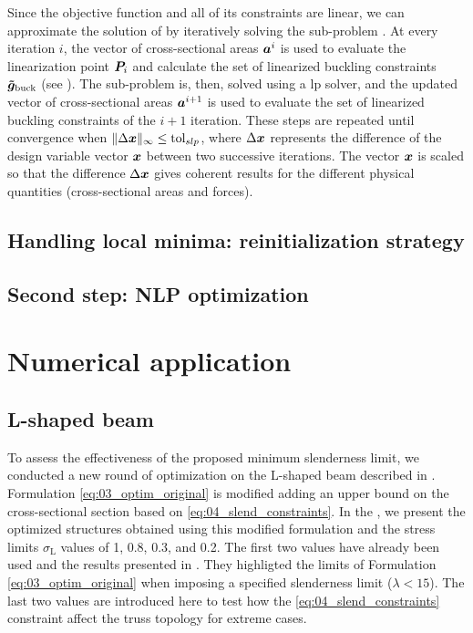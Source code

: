 Since the objective function and all of its constraints are linear, we can approximate the solution of  by iteratively solving the sub-problem . At every iteration $i$, the vector of cross-sectional areas $\bm{a}^i$ is used to evaluate the linearization point $\bm{P}_{i}$ and calculate the set of linearized buckling constraints $\bm{\tilde{g}}_{\textrm{buck}}$ (see ). The sub-problem  is, then, solved using a \gls{lp} solver, and the updated vector of cross-sectional areas $\bm{a}^{i+1}$ is used to evaluate the set of linearized buckling constraints of the $i+1$ iteration. These steps are repeated until convergence \ie when $\lVert\Delta \bm{x}\rVert_\infty\leq \text{tol}_{slp}$, where $\Delta \bm{x}$ represents the difference of the design variable vector $\bm{x}$ between two successive iterations. The vector $\bm{x}$ is scaled so that the difference $\Delta \bm{x}$ gives coherent results for the different physical quantities (cross-sectional areas and forces). 

\subsection{Handling local minima: reinitialization strategy}

\subsection{Second step: NLP optimization}

\section{Numerical application}

\subsection{L-shaped beam}

To assess the effectiveness of the proposed minimum slenderness limit, we conducted a new round of optimization on the L-shaped beam described in . Formulation \ref{eq:03_optim_original} is modified adding an upper bound on the cross-sectional section based on \ref{eq:04_slend_constraints}. In the , we present the optimized structures obtained using this modified formulation and the stress limits $\sigma_\text{L}$ values of 1, 0.8, 0.3, and 0.2. The first two values have already been used and the results presented in . They highligted the limits of Formulation \ref{eq:03_optim_original} when imposing a specified slenderness limit ($\lambda<15$). The last two values are introduced here to test how the \ref{eq:04_slend_constraints} constraint affect the truss topology for extreme cases. 

